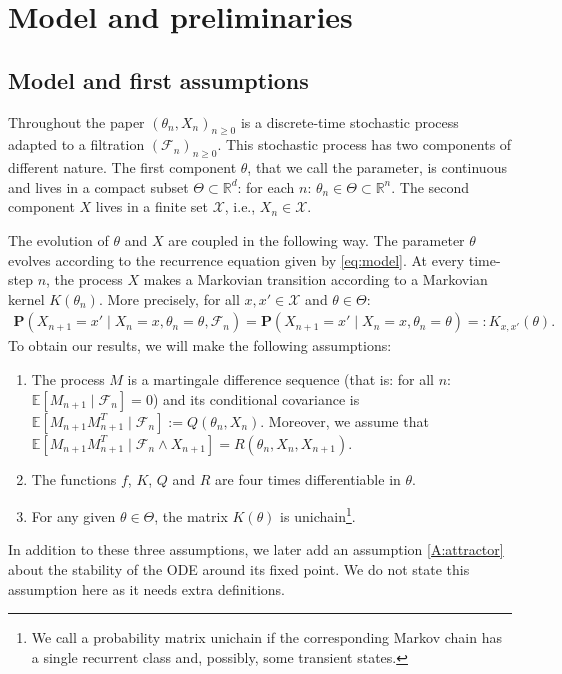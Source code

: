 \documentclass{article}
\newcommand{\R}{\mathbb{R}}
\newcommand{\calX}{\mathcal{X}}
\newcommand{\calF}{\mathcal{F}}
\newcommand\Proba[1]{\mathbf{P}\left(#1\right)}
\newcommand\E{\mathbb{E}}
\newcommand\esp[1]{\E\left[#1\right]}
\begin{document}
\section{Model and preliminaries}
\label{sec:model}

\subsection{Model and first assumptions}

Throughout the paper $(\theta_n,X_n)_{n\ge0}$ is a discrete-time stochastic process adapted to a filtration $(\calF_n)_{n\ge0}$. This stochastic process has two components of different nature. The first component $\theta$, that we call the parameter, is continuous and lives in a compact subset $\Theta\subset\R^d$: for each $n$: $\theta_n\in\Theta\subset\R^n$.  The second component $X$ lives in a finite set $\calX$, i.e., $X_n\in\calX$.

The evolution of $\theta$ and $X$ are coupled in the following way. The parameter $\theta$ evolves according to the recurrence equation given by \eqref{eq:model}.  At every time-step $n$, the process $X$ makes a Markovian transition according to a Markovian kernel $K(\theta_n)$. More precisely, for all $x,x'\in\calX$ and $\theta\in\Theta$:
\begin{align}
    \label{eq:Markov}
    \Proba{X_{n+1} = x' \mid X_n=x, \theta_n = \theta, \calF_n} = \Proba{X_{n+1} = x' \mid X_n=x, \theta_n = \theta} =: K_{x,x'}(\theta).
\end{align}
To obtain our results, we will make the following assumptions:
\begin{enumerate}[label=(A\arabic*)]
    \item \label{A:mart} The process $M$ is a martingale difference sequence (that is: for all $n$: $\esp{M_{n+1}\mid\calF_n}=0$) and its conditional covariance is $\esp{M_{n+1}M_{n+1}^T\mid\calF_n}:=Q(\theta_n,X_n)$. Moreover, we assume that $\esp{M_{n+1}M_{n+1}^T\mid\calF_n\land X_{n+1}}=R(\theta_n,X_n,X_{n+1})$.
    \item \label{A:cont} The functions $f$, $K$, $Q$ and $R$ are four times differentiable in $\theta$.
    \item \label{A:unichain} For any given $\theta\in\Theta$, the matrix $K(\theta)$ is unichain\footnote{We call a probability matrix unichain if the corresponding Markov chain has a single recurrent class and, possibly, some transient states.}.
\end{enumerate}
In addition to these three assumptions, we later add an assumption \ref{A:attractor} about the stability of the ODE around its fixed point. We do not state this assumption here as it needs extra definitions.
\end{document}
